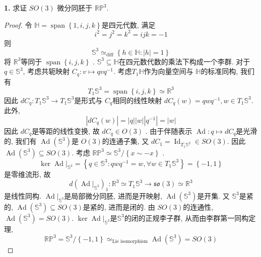 \documentclass[../main.tex]{subfiles}
\begin{document}
\begin{exercise}{}{} 
\textbf{1.} 求证 \(SO(3)\) 微分同胚于 \(\mathbb{RP}^{3}\). 

\end{exercise}
\begin{proof}
令 \(  \mathbb{H}= \operatorname{span}\left\{ 1,i,j,k \right\}  \)是四元代数, 满足  \[
i^{2}= j^{2}= k^{2}= ijk= -1
\] 则 \[
\mathbb{S}^{3}\simeq_{\text{diff}} \left\{ h\in \mathbb{H}: \left| h \right|= 1  \right\}
\]将 \(  \mathbb{R} ^{3}  \)等同于 \(  \operatorname{span}\left\{ i,j,k \right\}  \)  .  \(  \mathbb{S}^{3}  \subseteq \mathbb{H}\)在四元数代数的乘法下构成一个李群. 对于 \(  q\in \mathbb{S}^{3}  \), 考虑共轭映射 \(  C_{q}: v\mapsto  q v q^{-1}  \).  考虑\(  T_{1}\mathbb{H}  \)作为向量空间与 \(  \mathbb{H}  \)的标准同构, 我们有   \[
T_{1}\mathbb{S}^{3}= \operatorname{span}\left\{ i,j,k \right\}\simeq  \mathbb{R} ^{3}
\]因此 \(  d C_{q}:  T_{1}\mathbb{S}^{3}\to T_1 \mathbb{S}^{3}  \)是形式与 \(  C_{q}  \)相同的线性映射 \(  d C_{q} \left( w \right)= qwq ^{-1} , w \in T_{1}\mathbb{S}^{3}  \). 此外,  \[
\left|  d C_{q}\left( w \right)  \right|= \left| q \right|\left| w \right|\left| q ^{-1}  \right|= \left| w \right|     
\]   因此 \(  d C_{q}  \)是等距的线性变换, 故 \(  dC_{q}\in O\left( 3 \right)   \)  . 由于伴随表示 \(  \operatorname{Ad} : q\mapsto  d C_{q}  \)是光滑的,  我们有 \(  \operatorname{Ad}\left( \mathbb{S}^{3} \right)   \)是 \(  O\left( 3 \right)   \)的连通子集, 又 \(  d C_{1}=  \operatorname{Id}_{T_1 \mathbb{S}^{3}}  \in SO\left( 3 \right) \). 因此 \(  \operatorname{Ad}\left( \mathbb{S}^{3} \right)\subseteq  SO\left( 3 \right)    \).     考虑 \(  \mathbb{RP}^{3}\simeq \mathbb{S}^{3}/\left\{ x\sim -x \right\}  \) .
 \[
 \operatorname{ker} \operatorname{Ad}|_{\mathbb{S}^{3}}= \left\{ q \in \mathbb{S}^{3}: q w q^{-1} = w,\forall w \in T_1 \mathbb{S}^{3} \right\}= \left\{ -1,1 \right\} 
 \] 是零维流形, 故 \[
 d \left( \operatorname{Ad}|_{\mathbb{S}^{3}} \right)_{1} :  \mathbb{R} ^{3}\simeq T_{1}\mathbb{S}^{3}\to  \mathfrak{so}\left( 3 \right)\simeq \mathbb{R} ^{3} 
 \]是线性同构.   \(  \operatorname{Ad}|_{\mathbb{S}^{3}}  \)是局部微分同胚, 进而是开映射,  \(  \operatorname{Ad}\left( \mathbb{S}^{3} \right)   \)是开集. 又 \(  \mathbb{S}^{3}  \)是紧的,  \(  \operatorname{Ad}\left( \mathbb{S}^{3} \right)  \subseteq SO\left( 3 \right)  \)是紧的, 进而是闭的. 由 \(  SO\left( 3 \right)   \)的连通性,  \(  \operatorname{Ad}\left( \mathbb{S}^{3} \right)= SO\left( 3 \right)    \).      \(  \operatorname{ker} \operatorname{Ad}|_{\mathbb{S}^{3}}  \)是\(  \mathbb{S}^{3}  \)的闭的正规李子群,  从而由李群第一同构定理, \[
 \mathbb{RP}^{3}= \mathbb{S}^{3}/\left\{ -1,1 \right\}\simeq _{\text{Lie isomorphism}} \operatorname{Ad}\left( \mathbb{S}^{3} \right)=  SO\left( 3 \right)  
 \]
\end{proof}
\end{document}

